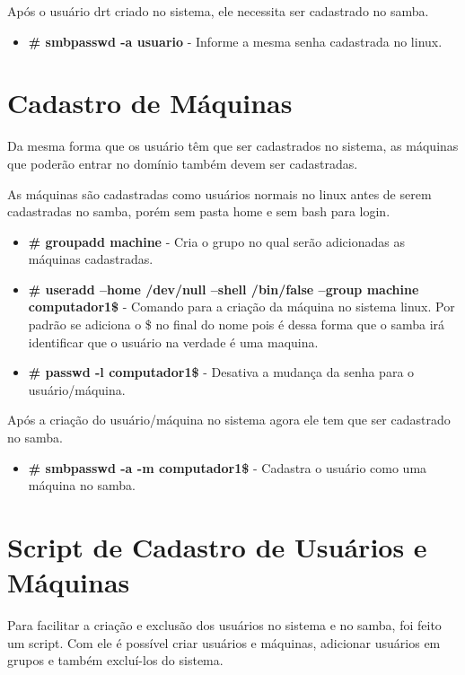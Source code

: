 Após o usuário drt criado no sistema, ele necessita ser cadastrado no samba.

\begin{itemize}
	\item \textbf{\# smbpasswd -a usuario} - Informe a mesma senha cadastrada no linux.
\end{itemize}

\section{Cadastro de Máquinas}

Da mesma forma que os usuário têm que ser cadastrados no sistema, as máquinas que poderão entrar no domínio também devem ser cadastradas.

As máquinas são cadastradas como usuários normais no linux antes de serem cadastradas no samba, porém sem pasta home e sem bash para login.

\begin{itemize}
	\item \textbf{\# groupadd machine} - Cria o grupo no qual serão adicionadas as máquinas cadastradas.
	\item \textbf{\# useradd --home /dev/null --shell /bin/false --group machine computador1\$} - 	Comando para a criação da máquina no sistema linux. Por padrão se adiciona o \$ no final do nome pois é dessa forma que o samba irá identificar que o usuário na verdade é uma maquina. 
	\item \textbf{\# passwd -l computador1\$} - Desativa a mudança da senha para o usuário/máquina.
\end{itemize}

Após a criação do usuário/máquina no sistema agora ele tem que ser cadastrado no samba.

\begin{itemize}	
	\item \textbf{\# smbpasswd -a -m computador1\$} - Cadastra o usuário como uma máquina no samba.
\end{itemize}


\section{Script de Cadastro de Usuários e Máquinas}

Para facilitar a criação e exclusão dos usuários no sistema e no samba, foi feito um script. Com ele é possível criar usuários e máquinas, adicionar usuários em grupos e também excluí-los do sistema.

